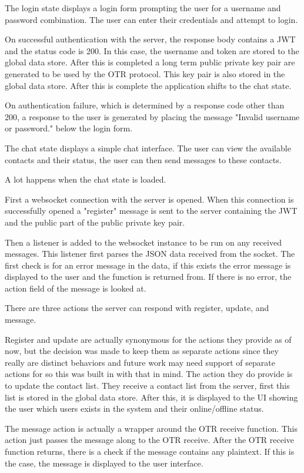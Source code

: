 The login state displays a login form prompting the user for a username and password combination. The user can enter their credentials and attempt to login. 


On successful authentication with the server, the response body contains a JWT and the status code is 200. In this case, the username and token are stored to the global data store. After this is completed a long term public private key pair are generated to be used by the OTR protocol. This key pair is also stored in the global data store. After this is complete the application shifts to the chat state.


On authentication failure, which is determined by a response code other than 200, a response to the user is generated by placing the message "Invalid username or password." below the login form. 


The chat state displays a simple chat interface. The user can view the available contacts and their status, the user can then send messages to these contacts. 


A lot happens when the chat state is loaded. 


First a websocket connection with the server is opened. When this connection is successfully opened a "register" message is sent to the server containing the JWT and the public part of the public private key pair. 


Then a listener is added to the websocket instance to be run on any received messages. This listener first parses the JSON data received from the socket. The first check is for an error message in the data, if this exists the error message is displayed to the user and the function is returned from. If there is no error, the action field of the message is looked at. 


There are three actions the server can respond with register, update, and message.


Register and update are actually synonymous for the actions they provide as of now, but the decision was made to keep them as separate actions since they really are distinct behaviors and future work may need support of separate actions for so this was built in with that in mind. The action they do provide is to update the contact list. They receive a contact list from the server, first this list is stored in the global data store. After this, it is displayed to the UI showing the user which users exists in the system and their online/offline status.


The message action is actually a wrapper around the OTR receive function. This action just passes the message along to the OTR receive. After the OTR receive function returns, there is a check if the message contains any plaintext. If this is the case, the message is displayed to the user interface.


